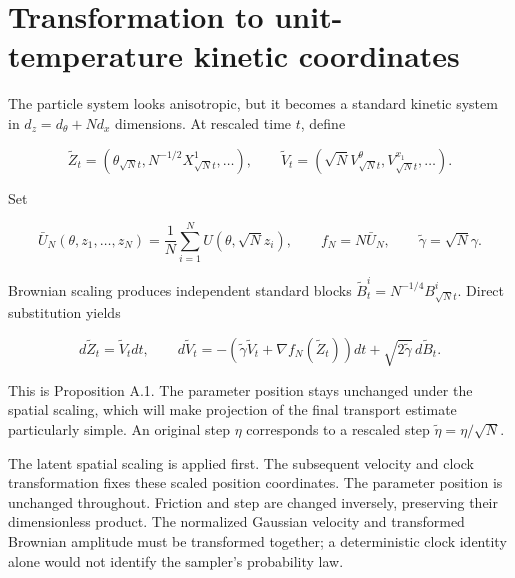 \documentclass[11pt,a4paper]{report}
\begin{document}
\section{\texorpdfstring{Transformation to unit-temperature kinetic coordinates}{Transformation to unit-temperature kinetic coordinates}}


The particle system looks anisotropic, but it becomes a standard kinetic
system in \(d_z=d_\theta+Nd_x\) dimensions. At rescaled time \(t\), define


\[\widetilde Z_t=(\theta_{\sqrt Nt},N^{-1/2}X^1_{\sqrt Nt},\ldots),
\qquad\widetilde V_t=(\sqrt N V^\theta_{\sqrt Nt},V^{x_1}_{\sqrt Nt},\ldots).\]


Set


\[\bar U_N(\theta,z_1,\ldots,z_N)=\frac1N\sum_{i=1}^NU(\theta,\sqrt N z_i),
\qquad f_N=N\bar U_N,\qquad\widetilde\gamma=\sqrt N\gamma.\]


Brownian scaling produces independent standard blocks
\(\widetilde B_t^i=N^{-1/4}B^i_{\sqrt Nt}\). Direct substitution yields


\[d\widetilde Z_t=\widetilde V_tdt,\qquad
d\widetilde V_t=-(\widetilde\gamma\widetilde V_t+\nabla f_N(\widetilde Z_t))dt
+\sqrt{2\widetilde\gamma}\,d\widetilde B_t.\]


This is Proposition A.1. The parameter position stays unchanged under the
spatial scaling, which will make projection of the final transport estimate
particularly simple. An original step \(\eta\) corresponds to a rescaled
step \(\widetilde\eta=\eta/\sqrt N\).



The latent spatial scaling is applied first. The subsequent velocity and clock transformation fixes these scaled position coordinates. The parameter position is unchanged throughout. Friction and step are changed inversely, preserving their dimensionless product. The normalized Gaussian velocity and transformed Brownian amplitude must be transformed together; a deterministic clock identity alone would not identify the sampler’s probability law.
\end{document}
